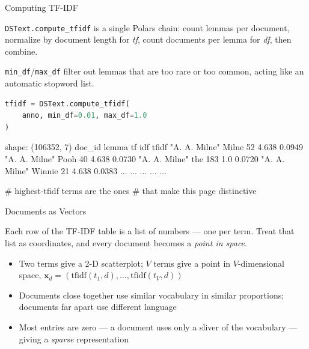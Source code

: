 \documentclass[8pt,aspectratio=169]{beamer}
\begin{document}
\begin{frame}[fragile]{Computing TF-IDF}
\begin{splitcode}{%

\texttt{DSText.compute\_tfidf} is a single Polars chain: count lemmas per document, normalize by document length for \textit{tf}, count documents per lemma for \textit{df}, then combine.

\texttt{min\_df}/\texttt{max\_df} filter out lemmas that are too rare or too common, acting like an automatic stopword list.

}
\begin{lstlisting}[language=Python]
tfidf = DSText.compute_tfidf(
    anno, min_df=0.01, max_df=1.0
)
\end{lstlisting}
\begin{codeoutput}
shape: (106352, 7)
doc_id         lemma   tf   idf    tfidf
"A. A. Milne"  Milne   52   4.638  0.0949
"A. A. Milne"  Pooh    40   4.638  0.0730
"A. A. Milne"  the     183  1.0    0.0720
"A. A. Milne"  Winnie  21   4.638  0.0383
...            ...     ...  ...    ...

# highest-tfidf terms are the ones
# that make this page distinctive
\end{codeoutput}
\end{splitcode}
\end{frame}

\begin{textframe}{Documents as Vectors}

Each row of the TF-IDF table is a list of numbers --- one per term. Treat that list as coordinates, and every document becomes a \textit{point in space}.

\begin{itemize}
\item Two terms give a 2-D scatterplot; $V$ terms give a point in $V$-dimensional space, $\mathbf{x}_d = (\text{tfidf}(t_1,d),\dots,\text{tfidf}(t_V,d))$
\item Documents close together use similar vocabulary in similar proportions; documents far apart use different language
\item Most entries are zero --- a document uses only a sliver of the vocabulary --- giving a \textit{sparse} representation
\end{itemize}

\end{textframe}
\end{document}
